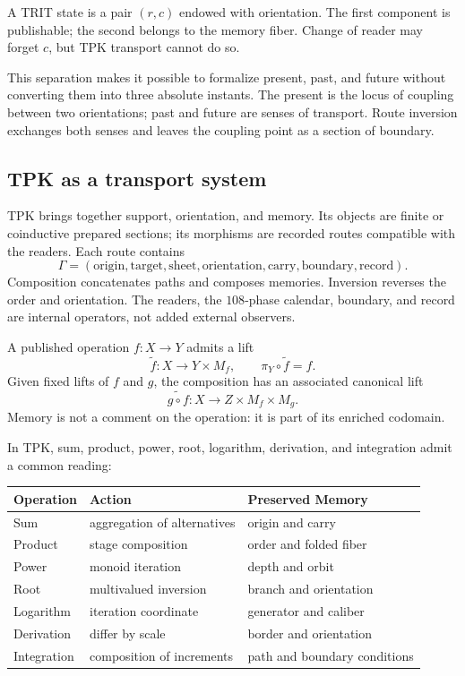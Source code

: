 \begin{definition}
A TRIT state is a pair \((r,c)\) endowed with orientation. The first
component is publishable; the second belongs to the memory fiber. Change of
reader may forget \(c\), but TPK transport cannot do so.
\end{definition}

This separation makes it possible to formalize present, past, and future without converting them
into three absolute instants. The present is the locus of coupling between two
orientations; past and future are senses of transport. Route inversion
exchanges both senses and leaves the coupling point as a section
of boundary.

\subsection{TPK as a transport system}

TPK brings together support, orientation, and memory. Its objects are
finite or coinductive prepared sections; its morphisms are recorded routes
compatible with the readers. Each route contains
\[
\Gamma=(\text{origin},\text{target},\text{sheet},\text{orientation},
\text{carry},\text{boundary},\text{record}).
\]
Composition concatenates paths and composes memories. Inversion reverses the
order and orientation. The readers, the \(108\)-phase calendar, boundary, and
record are internal operators, not added external observers.

A published operation \(f:X\to Y\) admits a lift
\[
 \widetilde f:X\longrightarrow Y\times M_f,
 \qquad \pi_Y\circ\widetilde f=f.
\]
Given fixed lifts of \(f\) and \(g\), the composition has an
associated canonical lift
\[
 \widetilde{g\circ f}:X\longrightarrow Z\times M_f\times M_g.
\]
Memory is not a comment on the operation: it is part of its enriched codomain.

\begin{proposition}
In TPK, sum, product, power, root, logarithm, derivation, and integration
admit a common reading:
\begin{center}
\begin{tabular}{@{}p{}p{}p{}@{}}
\toprule
Operation & Action & Preserved Memory \\
\midrule
Sum & aggregation of alternatives & origin and carry \\
Product & stage composition & order and folded fiber \\
Power & monoid iteration & depth and orbit \\
Root & multivalued inversion & branch and orientation \\
Logarithm & iteration coordinate & generator and caliber \\
Derivation & differ by scale & border and orientation \\
Integration & composition of increments & path and boundary conditions \\
\bottomrule
\end{tabular}
\end{center}
\end{proposition}

